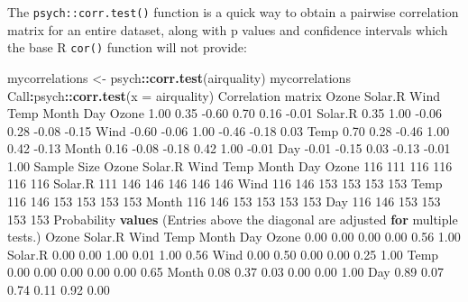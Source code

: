 \documentclass[]{article}
\newenvironment{Shaded}{\begin{snugshade}}{\end{snugshade}}
\newcommand{\ControlFlowTok}[1]{\textcolor[rgb]{0.13,0.29,0.53}{\textbf{#1}}}
\newcommand{\DataTypeTok}[1]{\textcolor[rgb]{0.13,0.29,0.53}{#1}}
\newcommand{\DecValTok}[1]{\textcolor[rgb]{0.00,0.00,0.81}{#1}}
\newcommand{\FloatTok}[1]{\textcolor[rgb]{0.00,0.00,0.81}{#1}}
\newcommand{\KeywordTok}[1]{\textcolor[rgb]{0.13,0.29,0.53}{\textbf{#1}}}
\newcommand{\NormalTok}[1]{#1}
\newcommand{\OperatorTok}[1]{\textcolor[rgb]{0.81,0.36,0.00}{\textbf{#1}}}
\newcommand{\StringTok}[1]{\textcolor[rgb]{0.31,0.60,0.02}{#1}}
\begin{document}
The \texttt{psych::corr.test()} function is a quick way to obtain a pairwise
correlation matrix for an entire dataset, along with p values and confidence
intervals which the base R \texttt{cor()} function will not provide:

\begin{Shaded}
\begin{Highlighting}[]
\NormalTok{mycorrelations <-}\StringTok{ }\NormalTok{psych}\OperatorTok{::}\KeywordTok{corr.test}\NormalTok{(airquality)}
\NormalTok{mycorrelations}
\NormalTok{Call}\OperatorTok{:}\NormalTok{psych}\OperatorTok{::}\KeywordTok{corr.test}\NormalTok{(}\DataTypeTok{x =}\NormalTok{ airquality)}
\NormalTok{Correlation matrix }
\NormalTok{        Ozone Solar.R  Wind  Temp Month   Day}
\NormalTok{Ozone    }\FloatTok{1.00}    \FloatTok{0.35} \FloatTok{-0.60}  \FloatTok{0.70}  \FloatTok{0.16} \FloatTok{-0.01}
\NormalTok{Solar.R  }\FloatTok{0.35}    \FloatTok{1.00} \FloatTok{-0.06}  \FloatTok{0.28} \FloatTok{-0.08} \FloatTok{-0.15}
\NormalTok{Wind    }\FloatTok{-0.60}   \FloatTok{-0.06}  \FloatTok{1.00} \FloatTok{-0.46} \FloatTok{-0.18}  \FloatTok{0.03}
\NormalTok{Temp     }\FloatTok{0.70}    \FloatTok{0.28} \FloatTok{-0.46}  \FloatTok{1.00}  \FloatTok{0.42} \FloatTok{-0.13}
\NormalTok{Month    }\FloatTok{0.16}   \FloatTok{-0.08} \FloatTok{-0.18}  \FloatTok{0.42}  \FloatTok{1.00} \FloatTok{-0.01}
\NormalTok{Day     }\FloatTok{-0.01}   \FloatTok{-0.15}  \FloatTok{0.03} \FloatTok{-0.13} \FloatTok{-0.01}  \FloatTok{1.00}
\NormalTok{Sample Size }
\NormalTok{        Ozone Solar.R Wind Temp Month Day}
\NormalTok{Ozone     }\DecValTok{116}     \DecValTok{111}  \DecValTok{116}  \DecValTok{116}   \DecValTok{116} \DecValTok{116}
\NormalTok{Solar.R   }\DecValTok{111}     \DecValTok{146}  \DecValTok{146}  \DecValTok{146}   \DecValTok{146} \DecValTok{146}
\NormalTok{Wind      }\DecValTok{116}     \DecValTok{146}  \DecValTok{153}  \DecValTok{153}   \DecValTok{153} \DecValTok{153}
\NormalTok{Temp      }\DecValTok{116}     \DecValTok{146}  \DecValTok{153}  \DecValTok{153}   \DecValTok{153} \DecValTok{153}
\NormalTok{Month     }\DecValTok{116}     \DecValTok{146}  \DecValTok{153}  \DecValTok{153}   \DecValTok{153} \DecValTok{153}
\NormalTok{Day       }\DecValTok{116}     \DecValTok{146}  \DecValTok{153}  \DecValTok{153}   \DecValTok{153} \DecValTok{153}
\NormalTok{Probability }\KeywordTok{values}\NormalTok{ (Entries above the diagonal are adjusted }\ControlFlowTok{for}\NormalTok{ multiple tests.) }
\NormalTok{        Ozone Solar.R Wind Temp Month  Day}
\NormalTok{Ozone    }\FloatTok{0.00}    \FloatTok{0.00} \FloatTok{0.00} \FloatTok{0.00}  \FloatTok{0.56} \FloatTok{1.00}
\NormalTok{Solar.R  }\FloatTok{0.00}    \FloatTok{0.00} \FloatTok{1.00} \FloatTok{0.01}  \FloatTok{1.00} \FloatTok{0.56}
\NormalTok{Wind     }\FloatTok{0.00}    \FloatTok{0.50} \FloatTok{0.00} \FloatTok{0.00}  \FloatTok{0.25} \FloatTok{1.00}
\NormalTok{Temp     }\FloatTok{0.00}    \FloatTok{0.00} \FloatTok{0.00} \FloatTok{0.00}  \FloatTok{0.00} \FloatTok{0.65}
\NormalTok{Month    }\FloatTok{0.08}    \FloatTok{0.37} \FloatTok{0.03} \FloatTok{0.00}  \FloatTok{0.00} \FloatTok{1.00}
\NormalTok{Day      }\FloatTok{0.89}    \FloatTok{0.07} \FloatTok{0.74} \FloatTok{0.11}  \FloatTok{0.92} \FloatTok{0.00}


\end{Highlighting}
\end{Shaded}
\end{document}

